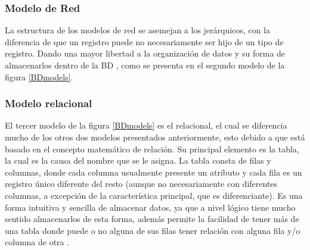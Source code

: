 \subsubsection{Modelo de Red}
\par
La estructura de los modelos de red se asemejan a los jerárquicos, con la diferencia de que un registro puede no necesariamente ser hijo de un tipo de registro. Dando una mayor libertad a la organización de datos y su forma de almacenarlos dentro de la BD \cite{camps_paré_2005}, como se presenta en el segundo modelo de la figura \ref{BDmodels}.

\subsubsection{Modelo relacional}
\par
El tercer modelo de la figura \ref{BDmodels} es el relacional, el cual se diferencia mucho de los otros dos modelos presentados anteriormente, esto debido a que está basado en el concepto matemático de relación. Su principal elemento es la tabla, la cual es la causa del nombre que se le asigna. La tabla consta de filas y columnas, donde cada columna usualmente presente un atributo y cada fila es un registro único diferente del resto (aunque no necesariamente con diferentes columnas, a excepción de la característica principal, que es diferenciante). Es una forma intuitiva y sencilla de almacenar datos, ya que a nivel lógico tiene mucho sentido almacenarlos de esta forma, además permite la facilidad de tener más de una tabla donde puede o no alguna de sus filas tener relación con alguna fila y/o columna de otra \cite{camps_paré_2005}.

